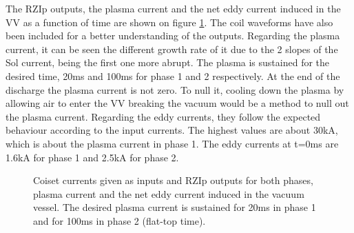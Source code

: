 \documentclass[a4paper,12pt,oneside]{book}
\begin{document}
The RZIp outputs, the plasma current and the net eddy current induced in the VV as a function of time are shown on figure \ref{fig_RZIp}. The coil waveforms have also been included for a better understanding of the outputs. Regarding the plasma current, it can be seen the different growth rate of it due to the 2 slopes of the Sol current, being the first one more abrupt. The plasma is sustained for the desired time, 20ms and 100ms for phase 1 and 2 respectively. %
%
At the end of the discharge the plasma current is not zero. To null it, cooling down the plasma by allowing air to enter the VV breaking the vacuum would be a method to null out the plasma current. 
%
%
Regarding the eddy currents, they follow the expected behaviour according to the input currents.
%
The highest values are about 30kA, which is about the plasma current in phase 1. The eddy currents at t=0ms are 1.6kA for phase 1 and 2.5kA for phase 2.
%

\begin{figure}[htbp]
\centering
{}
\hfill
{}

\hfill
{}

\hfill
{}
\caption{Coiset currents given as inputs and RZIp outputs for both phases, plasma current and the net eddy current induced in the vacuum vessel. The desired plasma current is sustained for 20ms in phase 1 and for 100ms in phase 2 (flat-top time).}
\label{fig_RZIp}
\end{figure}
\end{document}
